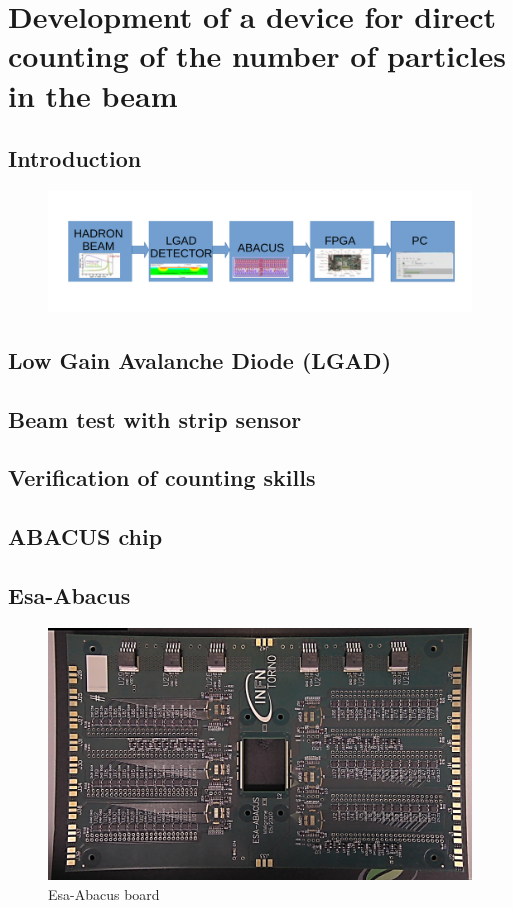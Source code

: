 \chapter{Development of a device for direct counting of the number of particles in the beam}

\section{Introduction}

\begin{figure}[H]
	\centering
	\includegraphics[width=0.99\linewidth]{IMG/ch2/BLOCK}
	\caption{}
	\label{fig:block}
\end{figure}

\section{Low Gain Avalanche Diode (LGAD)}

\section{Beam test with strip sensor}

\section{Verification of counting skills}

\section{ABACUS chip}

\section{Esa-Abacus}
\begin{figure}[H]
	\centering
	\includegraphics[width=0.7\linewidth]{IMG/ch2/EsaAbacus.png}
	\caption{Esa-Abacus board}
	\label{fig:esaabacus}
\end{figure}

